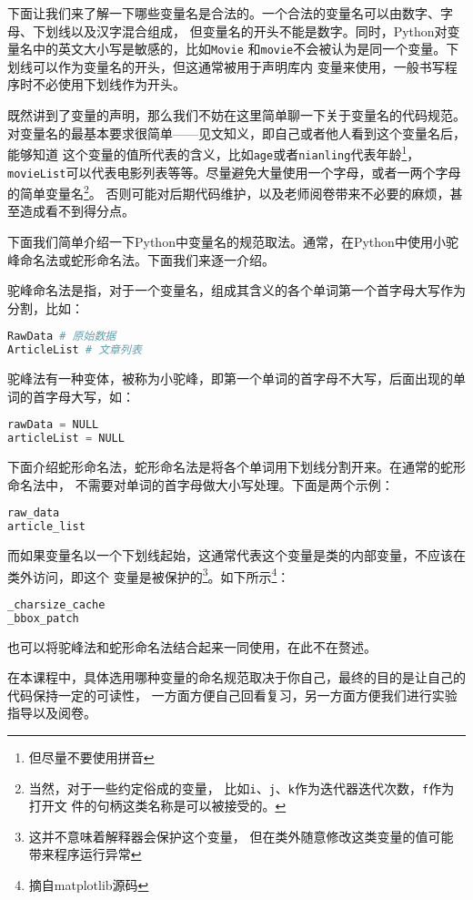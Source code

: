 下面让我们来了解一下哪些变量名是合法的。一个合法的变量名可以由数字、字母、下划线以及汉字混合组成，
但变量名的开头不能是数字。同时，Python对变量名中的英文大小写是敏感的，比如\texttt{Movie}
和\texttt{movie}不会被认为是同一个变量。下划线可以作为变量名的开头，但这通常被用于声明库内
变量来使用，一般书写程序时不必使用下划线作为开头。

既然讲到了变量的声明，那么我们不妨在这里简单聊一下关于变量名的代码规范。
对变量名的最基本要求很简单——见文知义，即自己或者他人看到这个变量名后，能够知道
这个变量的值所代表的含义，比如\texttt{age}或者\texttt{nianling}代表年龄\footnote{但尽量不要使用拼音}，
\texttt{movieList}可以代表电影列表等等。尽量避免大量使用一个字母，或者一两个字母的简单变量名\footnote{当然，对于一些约定俗成的变量，
比如\texttt{i}、\texttt{j}、\texttt{k}作为迭代器迭代次数，\texttt{f}作为打开文
件的句柄这类名称是可以被接受的。}。
否则可能对后期代码维护，以及老师阅卷带来不必要的麻烦，甚至造成看不到得分点。

下面我们简单介绍一下Python中变量名的规范取法。通常，在Python中使用小驼峰命名法或蛇形命名法。下面我们来逐一介绍。

驼峰命名法是指，对于一个变量名，组成其含义的各个单词第一个首字母大写作为分割，比如：
\begin{lstlisting}[language=Python]
RawData # 原始数据
ArticleList # 文章列表
\end{lstlisting}
驼峰法有一种变体，被称为小驼峰，即第一个单词的首字母不大写，后面出现的单词的首字母大写，如：
\begin{lstlisting}[language=Python]
rawData = NULL
articleList = NULL
\end{lstlisting}

下面介绍蛇形命名法，蛇形命名法是将各个单词用下划线分割开来。在通常的蛇形命名法中，
不需要对单词的首字母做大小写处理。下面是两个示例：
\begin{lstlisting}[language=Python]
raw_data
article_list
\end{lstlisting}
而如果变量名以一个下划线起始，这通常代表这个变量是类的内部变量，不应该在类外访问，即这个
变量是被保护的\footnote{这并不意味着解释器会保护这个变量，
但在类外随意修改这类变量的值可能带来程序运行异常}。如下所示\footnote{摘自matplotlib源码}：
\begin{lstlisting}[language=Python]
_charsize_cache
_bbox_patch
\end{lstlisting}

也可以将驼峰法和蛇形命名法结合起来一同使用，在此不在赘述。

在本课程中，具体选用哪种变量的命名规范取决于你自己，最终的目的是让自己的代码保持一定的可读性，
一方面方便自己回看复习，另一方面方便我们进行实验指导以及阅卷。

